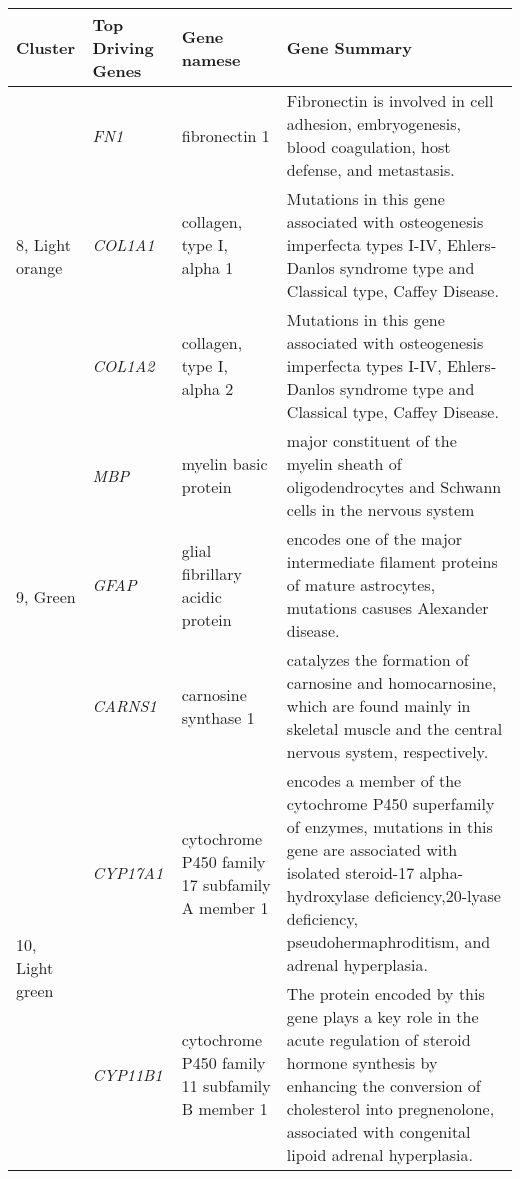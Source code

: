 \documentclass[10pt,letterpaper]{article}
\begin{document}
\begin{table}[!hp]
\begin{adjustwidth}{-.5in}{0in}
\begin{tabular}{|p{0.6in}|p{0.6in}|p{1.3 in}|p{3.8in}|}
\hline
Cluster & Top Driving \qquad Genes & Gene namese  & Gene Summary \\
\hline
 \multirow{3}{4em}{\scriptsize{8, Light orange} } & \small{\textit{FN1}}  & \scriptsize{fibronectin 1} & \scriptsize{Fibronectin is involved in cell adhesion, embryogenesis, blood coagulation, host defense, and metastasis.}   \\
 					 & \small{\textit{COL1A1}} & \scriptsize{collagen, type I, alpha 1} & \scriptsize{Mutations in this gene associated with osteogenesis imperfecta types I-IV, Ehlers-Danlos syndrome type and Classical type, Caffey Disease}. \\
					      & \small{\textit{COL1A2}} & \scriptsize{collagen, type I, alpha 2} & \scriptsize{Mutations in this gene associated with osteogenesis imperfecta types I-IV, Ehlers-Danlos syndrome type and Classical type, Caffey Disease}. \\
\hline
 \multirow{3}{4em}{\scriptsize{9, Green} } & \small{\textit{MBP}} & \scriptsize{myelin basic protein} & \scriptsize{major constituent of the myelin sheath of oligodendrocytes and Schwann cells in the nervous system}    \\
 					 & \small{\textit{GFAP}} & \scriptsize{glial fibrillary acidic protein} & \scriptsize{encodes one of the major intermediate filament proteins of mature astrocytes, mutations casuses Alexander disease.} \\
					      & \small{\textit{CARNS1}} & \scriptsize{carnosine synthase 1} & \scriptsize{catalyzes the formation of carnosine and homocarnosine, which are found mainly in skeletal muscle and the central nervous system, respectively}. \\
\hline
 \multirow{3}{4em}{\scriptsize{10, Light green} } & \small{\textit{CYP17A1}} & \scriptsize{cytochrome P450 family 17 subfamily A member 1} & \scriptsize{encodes a member of the cytochrome P450 superfamily of enzymes, mutations in this gene are associated with isolated steroid-17 alpha-hydroxylase deficiency,20-lyase deficiency, pseudohermaphroditism, and adrenal hyperplasia.}    \\
 					 & \small{\textit{CYP11B1}} & \scriptsize{cytochrome P450 family 11 subfamily B member 1} & \scriptsize{The protein encoded by this gene plays a key role in the acute regulation of steroid hormone synthesis by enhancing the conversion of cholesterol into pregnenolone, associated with congenital lipoid adrenal hyperplasia.} \\

\end{tabular}
\end{adjustwidth}
\end{table}
\end{document}
